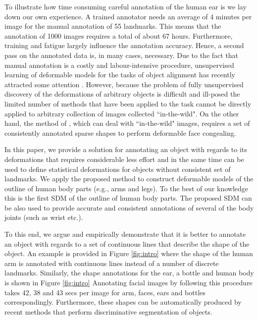 To illustrate how time consuming careful annotation of the human ear is we lay down our own experience. A trained annotator needs an average of 4 minutes per image for the manual annotation of 55 landmarks. This means that the annotation of 1000 images requires a total of about 67 hours. Furthermore,  training and fatigue largely influence the annotation accuracy. Hence, a second pass on the annotated data is, in many cases, necessary. Due to the fact that manual annotation is a costly and labour-intensive procedure, unsupervised learning of deformable models for the tasks of object alignment has recently attracted some attention \cite{frey2003learning, baker2004automatic, cootes2004groupwise, jojic2006escaping, Huang2006, kokkinos2007unsupervised, jiang2009learning, liu2009simultaneous, Zhang2012}. However, because the problem of fully unsupervised discovery of the deformations of arbitrary objects is difficult and ill-posed the limited number of methods that have been applied to the task cannot be directly applied to arbitrary collection of images collected ``in-the-wild". On the other hand, the method of \cite{antonakos2014automatic}, which can deal with ``in-the-wild" images, requires a set of consistently annotated sparse shapes to perform deformable face congealing.


In this paper, we provide a solution for annotating an object with regards to its deformations that requires considerable less effort and in the same time can be used to define statistical deformations for objects without consistent set of landmarks. We apply the proposed method to construct deformable models of the outline of  human body parts (e.g., arms and legs). To the best of our knowledge this is the first SDM of the outline of human body parts. The proposed SDM can be also used to provide accurate and consistent annotations of several of the body joints (such as wrist etc.). 

To this end, we argue and empirically demonstrate that it is better to annotate an object with regards to a set of continuous lines that describe the shape of the object. An example is provided in Figure \ref{fig:intro} where the shape of the human arm is annotated with continuous lines instead of a number of discrete landmarks. Similarly, the shape annotations for the ear, a bottle and human body is shown in Figure \ref{fig:intro} Annotating facial images by following this procedure takes 42, 38 and 43 secs per image for arm, faces, ears and bottles correspondingly. Furthermore, these shapes can be automatically produced by recent methods that perform discriminative segmentation of objects.

